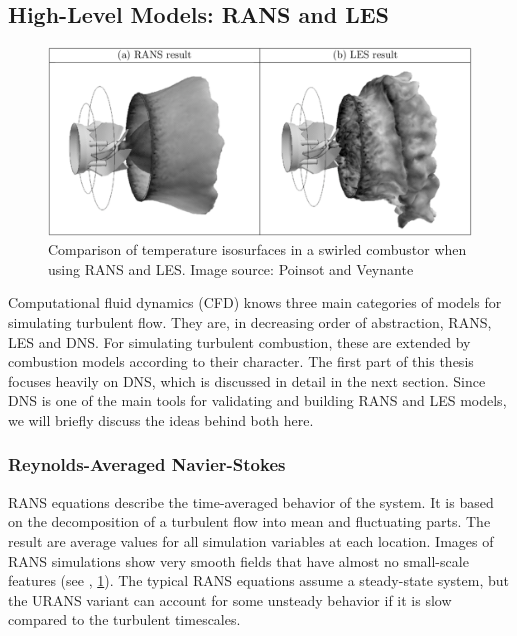 \subsection[High-Level Models: RANS and LES]
           {High-Level Models: \acs{RANS} and \acs{LES}} %
\label{sub:high_level_models}
%
\begin{figure}[t]
    \centering
    \includegraphics[width=\textwidth]{figures/rans_vs_les.png}
    \caption{Comparison of temperature isosurfaces in a swirled combustor when
    using \ac{RANS} and \ac{LES}. Image source: Poinsot and Veynante
    \cite{Poinsot2012}}
    \label{fig:rans_vs_les}
\end{figure}
%
Computational fluid dynamics (\acs{CFD}) knows three main categories
of models for simulating turbulent flow.
%
They are, in decreasing order of abstraction, \acf{RANS}, \acf{LES} and
\acf{DNS}.
%
For simulating turbulent combustion, these are extended by combustion models
according to their character.
%
The first part of this thesis focuses heavily on \ac{DNS}, which is discussed in
detail in the next section.
%
Since \ac{DNS} is one of the main tools for validating and building \ac{RANS}
and \ac{LES} models, we will briefly discuss the ideas behind both here.
%
\subsubsection{Reynolds-Averaged Navier-Stokes} %
\label{ssub:rans}
%
\acl{RANS} equations describe the time-averaged behavior of the system.
%
It is based on the decomposition of a turbulent flow into mean and
fluctuating parts.
%
The result are average values for all simulation variables at each location.
%
Images of \ac{RANS} simulations show very smooth fields that have almost no
small-scale features (see \eg, \cref{fig:rans_vs_les}).
%
The typical \ac{RANS} equations assume a steady-state system, but the \ac{URANS}
variant can account for some unsteady behavior if it is slow compared to the
turbulent timescales.
%

